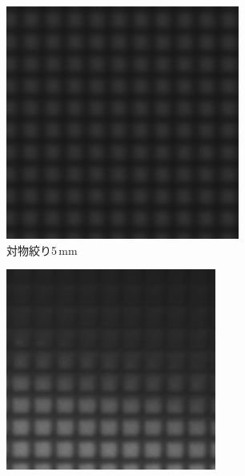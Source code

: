 \documentclass[titlepage]{jsarticle}
\begin{document}
\begin{figure}[htbp]
    \centering
    \begin{subfigure}{0.3\columnwidth}
        \centering
        \includegraphics[width=\columnwidth]{20um_blue_obj5mm_tri.png}
        \caption{対物絞り5\,mm}
        \label{fig:obj5}
    \end{subfigure}
    \begin{subfigure}{0.3\columnwidth}
        \centering
        \includegraphics[width=\columnwidth]{20um_blue_shiya_tri.png}

\end{subfigure}
\end{figure}
\end{document}
